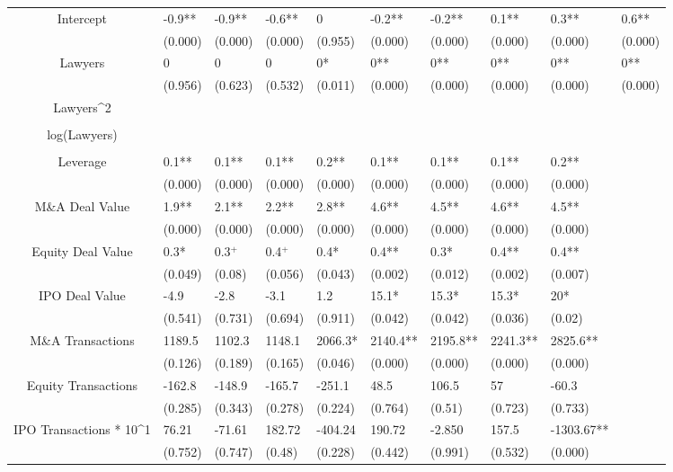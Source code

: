 \documentclass{article}
\begin{document}
\begin{table}[H]
\begin{tabular}{|clllllllll|}
Intercept & -0.9** & -0.9** & -0.6** & 0 & -0.2** & -0.2** & 0.1** & 0.3** & 0.6** \\ 
   & (0.000) & (0.000) & (0.000) & (0.955) & (0.000) & (0.000) & (0.000) & (0.000) & (0.000) \\ 
  Lawyers & 0 & 0 & 0 & 0* & 0** & 0** & 0** & 0** & 0** \\ 
   & (0.956) & (0.623) & (0.532) & (0.011) & (0.000) & (0.000) & (0.000) & (0.000) & (0.000) \\ 
  Lawyers^2 &  &  &  &  &  &  &  &  &  \\ 
   &  &  &  &  &  &  &  &  &  \\ 
  log(Lawyers) &  &  &  &  &  &  &  &  &  \\ 
   &  &  &  &  &  &  &  &  &  \\ 
  Leverage & 0.1** & 0.1** & 0.1** & 0.2** & 0.1** & 0.1** & 0.1** & 0.2** &  \\ 
   & (0.000) & (0.000) & (0.000) & (0.000) & (0.000) & (0.000) & (0.000) & (0.000) &  \\ 
  M\&A Deal Value & 1.9** & 2.1** & 2.2** & 2.8** & 4.6** & 4.5** & 4.6** & 4.5** &  \\ 
   & (0.000) & (0.000) & (0.000) & (0.000) & (0.000) & (0.000) & (0.000) & (0.000) &  \\ 
  Equity Deal Value & 0.3* & 0.3$^{+}$ & 0.4$^{+}$ & 0.4* & 0.4** & 0.3* & 0.4** & 0.4** &  \\ 
   & (0.049) & (0.08) & (0.056) & (0.043) & (0.002) & (0.012) & (0.002) & (0.007) &  \\ 
  IPO Deal Value & -4.9 & -2.8 & -3.1 & 1.2 & 15.1* & 15.3* & 15.3* & 20* &  \\ 
   & (0.541) & (0.731) & (0.694) & (0.911) & (0.042) & (0.042) & (0.036) & (0.02) &  \\ 
  M\&A Transactions & 1189.5 & 1102.3 & 1148.1 & 2066.3* & 2140.4** & 2195.8** & 2241.3** & 2825.6** &  \\ 
   & (0.126) & (0.189) & (0.165) & (0.046) & (0.000) & (0.000) & (0.000) & (0.000) &  \\ 
  Equity Transactions & -162.8 & -148.9 & -165.7 & -251.1 & 48.5 & 106.5 & 57 & -60.3 &  \\ 
   & (0.285) & (0.343) & (0.278) & (0.224) & (0.764) & (0.51) & (0.723) & (0.733) &  \\ 
  IPO Transactions * 10^1 & 76.21 & -71.61 & 182.72 & -404.24 & 190.72 & -2.850 & 157.5 & -1303.67** &  \\ 
   & (0.752) & (0.747) & (0.48) & (0.228) & (0.442) & (0.991) & (0.532) & (0.000) &  \\ 

\end{tabular}
\end{table}
\end{document}
